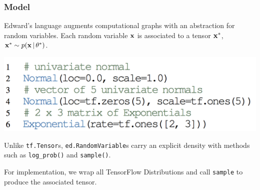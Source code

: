 \documentclass[10pt,
               xcolor={usenames,dvipsnames},
               hyperref={colorlinks,linktoc=all,citecolor=Plum,linkcolor=MidnightBlue,urlcolor=MidnightBlue},noamssymb]{beamer}
\begin{document}


\begin{frame}
\frametitle{Model}
Edward's language augments computational graphs with an abstraction
for random variables.
Each random variable $\boldsymbol{\mathbf{x}}$ is associated to a tensor $\boldsymbol{\mathbf{x}}^*$,
$\boldsymbol{\mathbf{x}}^*\sim p(\boldsymbol{\mathbf{x}}\,|\,\theta^*)$.

\vspace{-1.0ex}
\includegraphics[height=0.20\textwidth]{img/random_variables.png}

Unlike \texttt{tf.Tensor}s, \texttt{ed.RandomVariable}s
carry an explicit density with methods
such as \texttt{log\_prob()} and \texttt{sample()}.

For implementation, we wrap all TensorFlow Distributions and call
\texttt{sample} to produce the associated tensor.
\end{frame}
\end{document}
